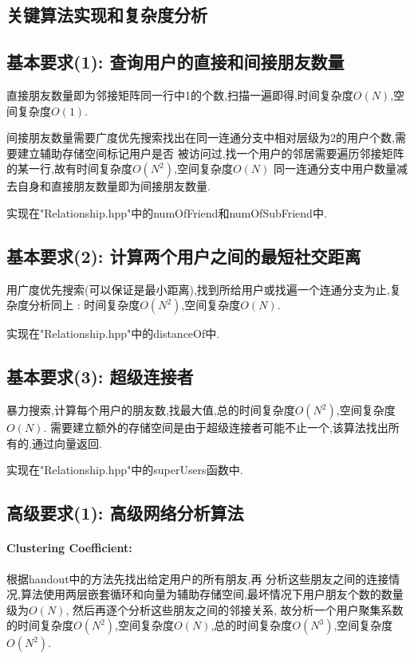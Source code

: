 \documentclass{article}
\begin{document}
\begin{CJK*}{UTF8}{gbsn}
\section{关键算法实现和复杂度分析}
\subsection{基本要求(1): 查询用户的直接和间接朋友数量}
\par 直接朋友数量即为邻接矩阵同一行中1的个数,扫描一遍即得,时间复杂度$O(N)$,空间复杂度$O(1)$.
\par 间接朋友数量需要广度优先搜索找出在同一连通分支中相对层级为2的用户个数,需要建立辅助存储空间标记用户是否
被访问过,找一个用户的邻居需要遍历邻接矩阵的某一行,故有时间复杂度$O(N^2)$,空间复杂度$O(N)$
同一连通分支中用户数量减去自身和直接朋友数量即为间接朋友数量.
\par 实现在"Relationship.hpp"中的numOfFriend和numOfSubFriend中.
\subsection{基本要求(2): 计算两个用户之间的最短社交距离}
\par 用广度优先搜索(可以保证是最小距离),找到所给用户或找遍一个连通分支为止,复杂度分析同上
: 时间复杂度$O(N^2)$,空间复杂度$O(N)$.
\par 实现在"Relationship.hpp"中的distanceOf中.
\subsection{基本要求(3): 超级连接者}
\par 暴力搜索,计算每个用户的朋友数,找最大值,总的时间复杂度$O(N^2)$,空间复杂度$O(N)$.
需要建立额外的存储空间是由于超级连接者可能不止一个,该算法找出所有的,通过向量返回.
\par 实现在"Relationship.hpp"中的superUsers函数中.
\subsection{高级要求(1): 高级网络分析算法}
\paragraph{Clustering Coefficient: } 根据handout中的方法先找出给定用户的所有朋友,再
分析这些朋友之间的连接情况,算法使用两层嵌套循环和向量为辅助存储空间,最坏情况下用户朋友个数的数量级为$O(N)$,
然后再逐个分析这些朋友之间的邻接关系,
故分析一个用户聚集系数的时间复杂度$O(N^2)$,空间复杂度$O(N)$,总的时间复杂度$O(N^3)$,空间复杂度$O(N^2)$.

\end{CJK*}
\end{document}
